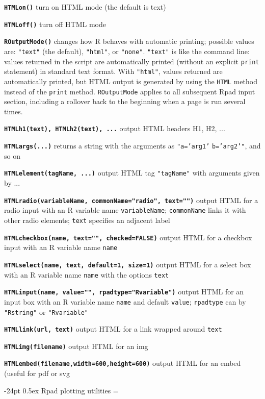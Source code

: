 \documentclass[10pt,landscape]{article}
\makeatletter
\renewcommand\section{\@startsection{section}{1}{0mm}%
                                     {-24pt}%
                                     {0.5ex}%
                                {\color{blue}\normalfont\large\bfseries}}
\newcommand{\code}{\texttt}
\newcommand{\bcode}[1]{\texttt{\textbf{#1}}}
\makeatother
\begin{document}
\begin{multicols}{3}
\bcode{HTMLon()}  turn on HTML mode (the default is text)

\bcode{HTMLoff()}  turn off HTML mode

\bcode{ROutputMode()} changes how R behaves with automatic
printing; possible values are: \code{"text"} (the default), \code{"html"}, or \code{"none"}. \code{"text"} is like
the command line: values returned in the script are automatically printed (without an explicit \code{print}
statement) in standard text format. With \code{"html"}, values returned are automatically printed, but HTML output is generated by
using the \code{HTML} method instead of the \code{print} method. \code{ROutputMode} applies to all subsequent Rpad input
section, including a rollover back to the beginning when a page is run
several times.

\bcode{HTMLh1(text), HTMLh2(text), ...} output HTML headers H1, H2, ...

\bcode{HTMLargs(...)} returns a string with the arguments as \code{"a='arg1'}
  \code{b='arg2'"}, and so on

\bcode{HTMLelement(tagName, ...)} output HTML tag \code{"tagName"} with arguments given by ...

\bcode{HTMLradio(variableName, commonName="radio", text="")}
  output HTML for a radio input with an R variable name
  \code{variableName}; \code{commonName} links it with other radio
  elements; \code{text} specifies an adjacent label

\bcode{HTMLcheckbox(name, text="", checked=FALSE)}
  output HTML for a checkbox input with an R variable name \code{name}

\bcode{HTMLselect(name, text, default=1, size=1)}
  output HTML for a select box with an R variable name \code{name}
  with the options \code{text}

\bcode{HTMLinput(name, value="", rpadtype="Rvariable")}
  output HTML for an input box with an R variable name \code{name} and
  default \code{value};
  \code{rpadtype} can by \code{"Rstring"} or \code{"Rvariable"}

\bcode{HTMLlink(url, text)}
  output HTML for a link wrapped around \code{text}

\bcode{HTMLimg(filename)}
  output HTML for an img

\bcode{HTMLembed(filename,width=600,height=600)}
  output HTML for an embed (useful for pdf or svg




\section{Rpad plotting utilities}
\everypar={\hangindent=9mm}


\end{multicols}
\end{document}
